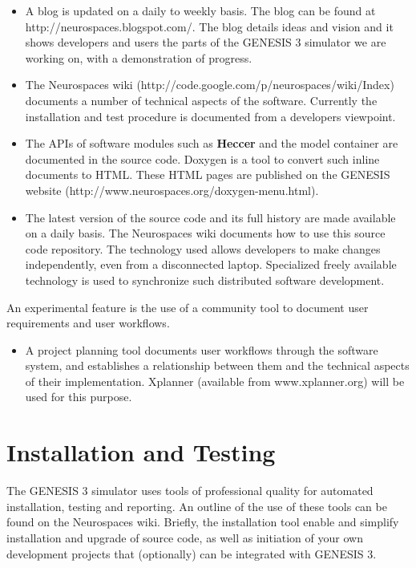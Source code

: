 \documentclass[12pt]{article}
\begin{document}
\begin{itemize}
\item A blog is updated on a daily to weekly basis.  The blog can be
  found at http://neurospaces.blogspot.com/.  The blog details ideas
  and vision and it shows developers and users the parts of the
  GENESIS 3 simulator we are working on, with a demonstration of
  progress.
\item The Neurospaces wiki
  (http://code.google.com/p/neurospaces/wiki/Index) documents a number
  of technical aspects of the software.  Currently the installation
  and test procedure is documented from a developers viewpoint.
\item The APIs of software modules such as {\bf Heccer} and the model
  container are documented in the source code.  Doxygen is a tool to
  convert such inline documents to HTML.  These HTML pages are
  published on the GENESIS website
  (http://www.neurospaces.org/doxygen-menu.html).
\item The latest version of the source code and its full history are
  made available on a daily basis.  The Neurospaces wiki documents how
  to use this source code repository.  The technology used allows
  developers to make changes independently, even from a disconnected
  laptop.  Specialized freely available technology is used to
  synchronize such distributed software development.
\end{itemize}

An experimental feature is the use of a community tool to document
user requirements and user workflows.

\begin{itemize}
\item A project planning tool documents user workflows through the
  software system, and establishes a relationship between them and the
  technical aspects of their implementation.  Xplanner (available from
  www.xplanner.org) will be used for this purpose.
\end{itemize}


\section{Installation and Testing}

The GENESIS 3 simulator uses tools of professional quality for
automated installation, testing and reporting.  An outline of the use
of these tools can be found on the Neurospaces wiki.  Briefly, the
installation tool enable and simplify installation and upgrade of source code, as well as initiation of your own development projects that (optionally) can be
integrated with GENESIS 3.
\end{document}

